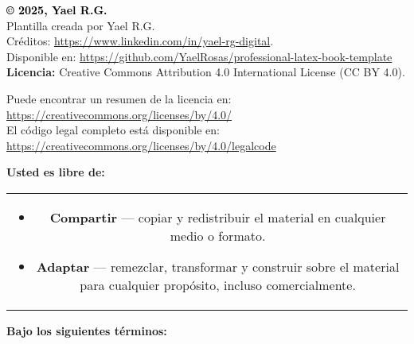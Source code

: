 
\thispagestyle{empty} %

\begin{center}
\vspace*{1cm}
\textcolor{black}{\Large \textbf{© 2025, Yael R.G.}} \\[0.3cm]


Plantilla creada por Yael R.G. \\[0.3cm]
Créditos: \url{https://www.linkedin.com/in/yael-rg-digital}. \\[0.3cm]
Disponible en: \url{https://github.com/YaelRosas/professional-latex-book-template} \\[0.5cm]

\textbf{Licencia:} Creative Commons Attribution 4.0 International License (CC BY 4.0). \\[0.5cm]

\begin{center}
    Puede encontrar un resumen de la licencia en: \\
    \url{https://creativecommons.org/licenses/by/4.0/} \\[0.5cm]
    
    El código legal completo está disponible en: \\
    \url{https://creativecommons.org/licenses/by/4.0/legalcode}
    \end{center}
    

\textbf{Usted es libre de:}
\end{center}

\begin{center}
\begin{tabular}{c}
    \begin{minipage}{0.9\textwidth}
    \color{black}
    \begin{itemize}
        \item \textbf{Compartir} — copiar y redistribuir el material en cualquier medio o formato.
        \item \textbf{Adaptar} — remezclar, transformar y construir sobre el material para cualquier propósito, incluso comercialmente.
    \end{itemize}
    \end{minipage}
    \end{tabular}    
\end{center}

\begin{center}
\textbf{Bajo los siguientes términos:}
\end{center}

